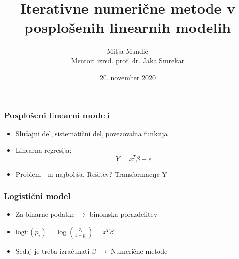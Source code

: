 \documentclass[14pt]{beamer}
\begin{document}
    \title[Diplomski seminar]{Iterativne numerične metode v posplošenih linearnih modelih}
    \author[Mitek]{Mitja Mandić \\ \small Mentor: izred. prof. dr. Jaka Smrekar}
    \date{20. november 2020} 

\begin{frame}
    \titlepage
\end{frame}

\begin{frame} \frametitle{Posplošeni linearni modeli}
    \begin{itemize}
    
        \item Slučajni del, sistematični del, povezovalna funkcija
        \pause
        \item Linearna regresija: 
            $$ Y = x ^ T\beta + \epsilon $$
        \item Problem - ni najboljša. Rešitev? Transformacija Y
    \end{itemize}
\end{frame}

\begin{frame} \frametitle{Logistični model}
    \begin{itemize}
    \item Za binarne podatke $\rightarrow$ binomska porazdelitev
    \pause
    \item $ \text{logit}(p_{i}) = \log (\frac{p_{i}}{1 - p_{i}}) = x ^ T\beta $ %

    \item Sedaj je treba izračunati $\beta$ $\rightarrow$ Numerične metode

\end{itemize}

%        
\end{frame}
\end{document}
